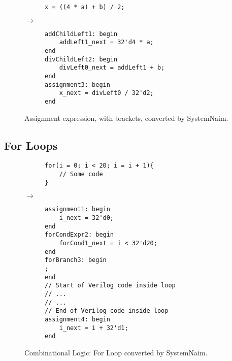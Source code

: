 \begin{figure}[H]
\centering
\begin{subfigure}{0.35\textwidth}
    \centering
    \begin{verbatim}
x = ((4 * a) + b) / 2;
    \end{verbatim}
\end{subfigure}%
{\LARGE$\rightarrow$}%
\begin{subfigure}{0.47\textwidth}
    \begin{verbatim}
addChildLeft1: begin
    addLeft1_next = 32'd4 * a;
end
divChildLeft2: begin
    divLeft0_next = addLeft1 + b;
end
assignment3: begin
    x_next = divLeft0 / 32'd2;
end
    \end{verbatim}
\end{subfigure}
\caption{Assignment expression, with brackets, converted by SystemNaim.}
\label{sn:expr_brackets}
\end{figure}


\subsection{For Loops}

\begin{figure}[H]
\centering
\begin{subfigure}{0.42\textwidth}
    \centering
    \begin{verbatim}
for(i = 0; i < 20; i = i + 1){
    // Some code
}
    \end{verbatim}
\end{subfigure}%
{\LARGE$\rightarrow$}%
\begin{subfigure}{0.5\textwidth}
    \begin{verbatim}
assignment1: begin
    i_next = 32'd0;
end
forCondExpr2: begin
    forCond1_next = i < 32'd20;
end
forBranch3: begin
;
end
// Start of Verilog code inside loop
// ...
// ...
// End of Verilog code inside loop
assignment4: begin
    i_next = i + 32'd1;
end
    \end{verbatim}
\end{subfigure}
\caption{Combinational Logic: For Loop converted by SystemNaim.}
\label{sn:for}
\end{figure}

